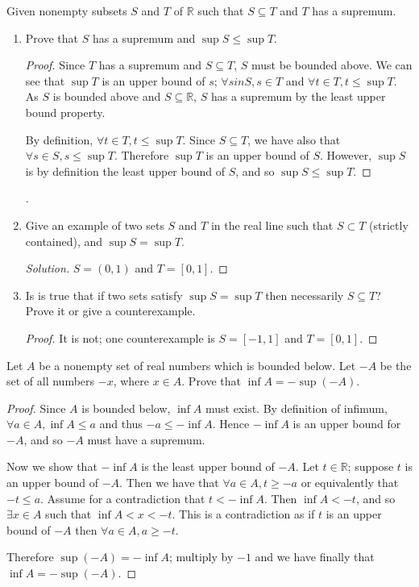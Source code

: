 \documentclass{article}
\newcommand{\R}{\mathbb{R}}
\newenvironment{problem}[2][Problem]{\begin{trivlist}
\item[\hskip \labelsep {\bfseries #1}\hskip \labelsep {\bfseries #2.}]}{\end{trivlist}}
\newenvironment{solution}{\begin{proof}[Solution]}{\end{proof}}
\begin{document}
\begin{problem}{3}
    Given nonempty subsets $S$ and $T$ of $\R$ such that $S \subseteq T$ and $T$ has a supremum.
\end{problem}
\begin{enumerate}
    \item[(a).] Prove that $S$ has a supremum and $\sup S \le \sup T$.
    \begin{proof}
        Since $T$ has a supremum and $S \subseteq T$, $S$ must be bounded above. We can see that $\sup T$ is an upper bound of $s$; $\forall s in S, s \in T$ and $\forall t \in T, t \le \sup T$. As $S$ is bounded above and $S \subseteq \R$, $S$ has a supremum by the least upper bound property.

        By definition, $\forall t \in T, t \le \sup T$. Since $S \subseteq T$, we have also that $\forall s \in S, s \le \sup T$. Therefore $\sup T$ is an upper bound of $S$. However, $\sup S$ is by definition the least upper bound of $S$, and so $\sup S \le \sup T$.
    \end{proof}.



    \item[(b).] Give an example of two sets $S$ and $T$ in the real line such that $S \subset T$ (strictly contained), and $\sup S = \sup T$.
    \begin{solution}
        $S = (0, 1)$ and $T = [0, 1]$.
    \end{solution}
    
    
    \item[(c).] Is is true that if two sets satisfy $\sup S = \sup T$ then necessarily $S \subseteq T$? Prove it or give a counterexample.
    \begin{proof}
        It is not; one counterexample is $S = [-1, 1]$ and $T = [0, 1]$.        
    \end{proof}
\end{enumerate}


\begin{problem}{4}
    Let $A$ be a nonempty set of real numbers which is bounded below. Let $-A$ be the set of all numbers $-x$, where $x \in A$. Prove that $\inf A = - \sup(-A)$.
\end{problem}

\begin{proof}
    Since $A$ is bounded below, $\inf A$ must exist. By definition of infimum, $\forall a \in A, \inf A \le a$ and thus $-a \le -\inf A$. Hence $-\inf A$ is an upper bound for $-A$, and so $-A$ must have a supremum.

    Now we show that $-\inf A$ is the least upper bound of $-A$. Let $t \in \R$; suppose $t$ is an upper bound of $-A$. Then we have that $\forall a \in A, t \ge -a$ or equivalently that $-t \le a$. Assume for a contradiction that $t < -\inf A$. Then $\inf A < -t$, and so $\exists x \in A$ such that $\inf A < x < -t$. This is a contradiction as if $t$ is an upper bound of $-A$ then $\forall a \in A, a \ge -t$.
    
    Therefore $\sup(-A) = -\inf A$; multiply by $-1$ and we have finally that $\inf A = - \sup (-A)$.


\end{proof}
\end{document}
